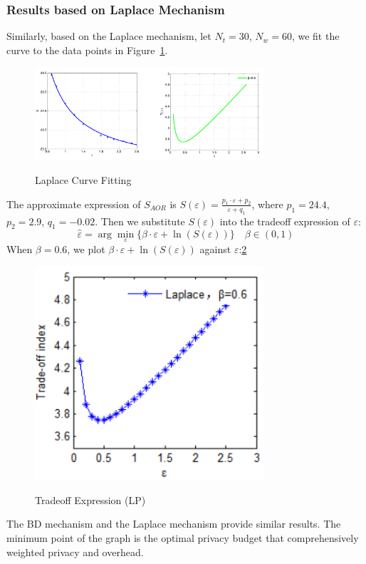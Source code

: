 \subsubsection{Results based on Laplace Mechanism}
Similarly, based on the Laplace mechanism, let $N_t=30$, $N_w=60$, we fit the curve to the data points in Figure~\ref{img:CurveLP}.

\begin{figure}
\includegraphics[width=8.5cm]{CurveLP}
\label{img:CurveLP}
\caption{Laplace Curve Fitting}
\end{figure}

The approximate expression of $S_{AOR}$ is $S(\varepsilon)=\frac{p_1 \cdot \varepsilon + p_2}{\varepsilon+q_1}$, where $p_1=24.4$, $p_2=2.9$, $q_1=-0.02$. Then we substitute $S(\varepsilon)$ into the tradeoff expression of $\varepsilon$:
$$
	\hat{\varepsilon}=\arg \min_\varepsilon \{ \beta \cdot \varepsilon + \ln (S(\varepsilon)) \} \quad \beta \in (0,1)
$$
When $\beta=0.6$, we plot $\beta \cdot \varepsilon + \ln (S(\varepsilon))$ against $\varepsilon$:\ref{img:TradeoffLP}

\begin{figure}
\includegraphics[width=8.5cm]{TradeoffLP}
\label{img:TradeoffLP}
\caption{Tradeoff Expression (LP)}
\end{figure}

The BD mechanism and the Laplace mechanism provide similar results. The minimum point of the graph is the optimal privacy budget that comprehensively weighted privacy and overhead.

